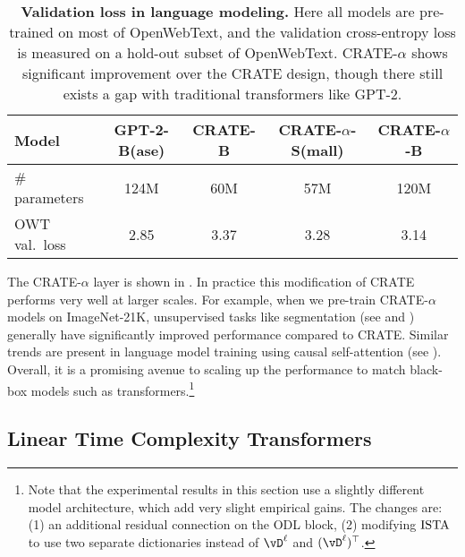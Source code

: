 \documentclass[\toplevelprefix/book-main.tex]{subfiles}
\begin{document}
\begin{table}
    \centering 
    \begin{tabular}{@{}lcccc@{}}
    \toprule
    Model & GPT-2-B(ase) & CRATE-B & CRATE-\(\alpha\)-S(mall) & CRATE-\(\alpha\)-B \\ 
    \midrule
    \midrule
    \# parameters & 124M & 60M & 57M & 120M \\
    OWT val.~loss & 2.85 & 3.37 & 3.28 & 3.14 \\
    \bottomrule
    \end{tabular}
    \caption{\small\textbf{Validation loss in language modeling.} Here all models are pre-trained on most of OpenWebText, and the validation cross-entropy loss is measured on a hold-out subset of OpenWebText. CRATE-\(\alpha\) shows significant improvement over the CRATE design, though there still exists a gap with traditional transformers like GPT-2.}
    \label{tab:crate_alpha_lm}
\end{table}

The CRATE-\(\alpha\) layer is shown in . In practice this modification of CRATE performs very well at larger scales. For example, when we pre-train CRATE-\(\alpha\) models on ImageNet-21K, unsupervised tasks like segmentation (see  and ) generally have significantly improved performance compared to CRATE. Similar trends are present in language model training using causal self-attention (see ). Overall, it is a promising avenue to scaling up the performance to match black-box models such as transformers.\footnote{Note that the experimental results in this section use a slightly different model architecture, which add very slight empirical gains. The changes are: (1) an additional residual connection on the ODL block, (2) modifying \(\operatorname{ISTA}\) to use two separate dictionaries instead of \(\vD^{\ell}\) and \((\vD^{\ell})^{\top}\).} 


\subsection{Linear Time Complexity Transformers}\label{sub:tost_experiments}
\end{document}
